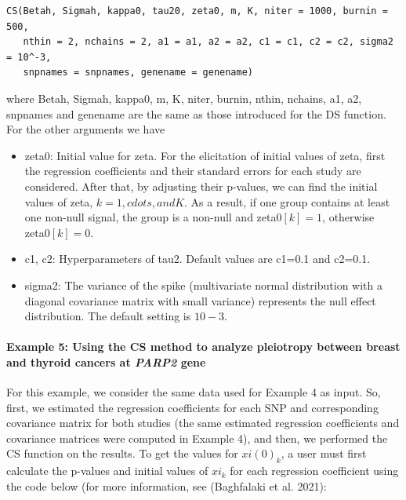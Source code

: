 \begin{verbatim}
CS(Betah, Sigmah, kappa0, tau20, zeta0, m, K, niter = 1000, burnin = 500,
   nthin = 2, nchains = 2, a1 = a1, a2 = a2, c1 = c1, c2 = c2, sigma2 = 10^-3,
   snpnames = snpnames, genename = genename)
\end{verbatim}

where Betah, Sigmah, kappa0, m, K, niter, burnin,
nthin, nchains, a1, a2, snpnames and genename are the same as those introduced for the DS function. For the other arguments we have

\begin{itemize}
\item
  zeta0: Initial value for zeta. For the elicitation of initial values of zeta, first the regression coefficients and their standard errors for each study are considered. After that, by adjusting their p-values, we can find the initial values of zeta, \(k=1, cdots, and K\). As a result, if one group contains at least one non-null signal, the group is a non-null and zeta0\([k]=1\), otherwise zeta0\([k]=0\).
\item
  c1, c2: Hyperparameters of tau2. Default values are c1=0.1 and c2=0.1.
\item
  sigma2: The variance of the spike (multivariate normal distribution with a diagonal covariance matrix with small variance) represents the null effect distribution. The default setting is \(10-3\).
\end{itemize}

\hypertarget{example-5-using-the-cs-method-to-analyze-pleiotropy-between-breast-and-thyroid-cancers-at-parp2-gene}{%
\paragraph{\texorpdfstring{Example 5: Using the CS method to analyze pleiotropy between breast and thyroid cancers at \emph{PARP2} gene}{Example 5: Using the CS method to analyze pleiotropy between breast and thyroid cancers at PARP2 gene}}\label{example-5-using-the-cs-method-to-analyze-pleiotropy-between-breast-and-thyroid-cancers-at-parp2-gene}}

For this example, we consider the same data used for Example 4 as input. So, first, we estimated the regression coefficients for each SNP and corresponding covariance matrix for both studies (the same estimated regression coefficients and covariance matrices were computed in Example 4),
and then, we performed the CS function on the results.
To get the values for \(xi(0)_k\), a user must first calculate the p-values and initial values of \(xi_k\) for each regression coefficient using the code below (for more information, see (Baghfalaki et al. 2021):

